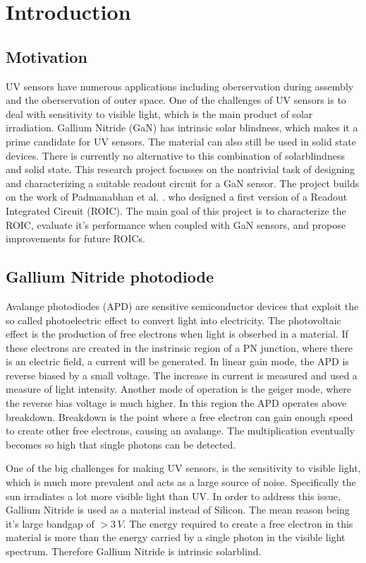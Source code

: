 \section{Introduction}\label{sec:introduction}

\subsection{Motivation}\label{ssec:motivation}
UV sensors have numerous applications including oberservation during assembly and the oberservation of outer space. One of the challenges of UV sensors is to deal with sensitivity to visible light, which is the main product of solar irradiation. Gallium Nitride (GaN) has intrinsic solar blindness, which makes it a prime candidate for UV sensors. The material can also still be used in solid state devices. There is currently no alternative to this combination of solarblindness and solid state. This research project focusses on the nontrivial task of designing and characterizing a suitable readout circuit for a GaN sensor. The project builds on the work of Padmanabhan et al. \cite{preethi}. who designed a first version of a Readout Integrated Circuit (ROIC). The main goal of this project is to characterize the ROIC, evaluate it's performance when coupled with GaN sensors, and propose improvements for future ROICs.

\subsection{Gallium Nitride photodiode}\label{ssec:gallium_nitride_uv_sensors}
Avalange photodiodes (APD) are sensitive semiconductor devices that exploit the so called photoelectric effect to convert light into electricity. The photovoltaic effect is the production of free electrons when light is obserbed in a material. If these electrons are created in the instrinsic region of a PN junction, where there is an electric field, a current will be generated. In linear gain mode, the APD is reverse biased by a small voltage. The increase in current is measured and used a measure of light intensity. Another mode of operation is the geiger mode, where the reverse bias voltage is much higher. In this region the APD operates above breakdown. Breakdown is the point where a free electron can gain enough speed to create other free electrons, causing an avalange. The multiplication eventually becomes so high that single photons can be detected. 

One of the big challenges for making UV sensors, is the sensitivity to visible light, which is much more prevalent and acts as a large source of noise. Specifically the sun irradiates a lot more visible light than UV. In order to address this issue, Gallium Nitride is used as a material instead of Silicon. The mean reason being it's large bandgap of $>3\,V$. The energy required to create a free electron in this material is more than the energy carried by a single photon in the visible light spectrum. Therefore Gallium Nitride is intrinsic solarblind. 

